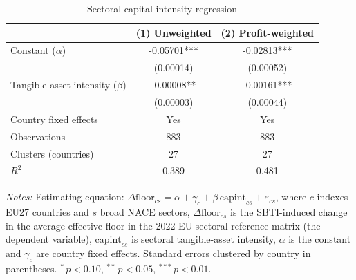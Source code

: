 \begin{table}[H]
\centering
\small
\setlength{\tabcolsep}{4pt}
\caption[Sectoral capital-intensity regression]{Sectoral capital-intensity regression}
\label{tab:stage2_h5_regression}
\begin{tabular}{@{}lcc@{}}
\toprule
 & (1) Unweighted & (2) Profit-weighted \\
\midrule
Constant ($\alpha$) & -0.05701*** & -0.02813*** \\
 & (0.00014) & (0.00052) \\
Tangible-asset intensity ($\beta$) & -0.00008** & -0.00161*** \\
 & (0.00003) & (0.00044) \\
Country fixed effects & Yes & Yes \\
Observations & 883 & 883 \\
Clusters (countries) & 27 & 27 \\
$R^2$ & 0.389 & 0.481 \\
\bottomrule
\end{tabular}

\vspace{0.35em}
\noindent\begin{minipage}{\textwidth}
\footnotesize\raggedright\textit{Notes:} Estimating equation: $\Delta\mathrm{floor}_{cs} = \alpha + \gamma_c + \beta\,\mathrm{capint}_{cs} + \varepsilon_{cs}$, where $c$ indexes EU27 countries and $s$ broad NACE sectors, $\Delta\mathrm{floor}_{cs}$ is the SBTI-induced change in the average effective floor in the 2022 EU sectoral reference matrix (the dependent variable), $\mathrm{capint}_{cs}$ is sectoral tangible-asset intensity, $\alpha$ is the constant and $\gamma_c$ are country fixed effects. Standard errors clustered by country in parentheses. $^{*}\,p<0.10$, $^{**}\,p<0.05$, $^{***}\,p<0.01$.
\end{minipage}
\end{table}
